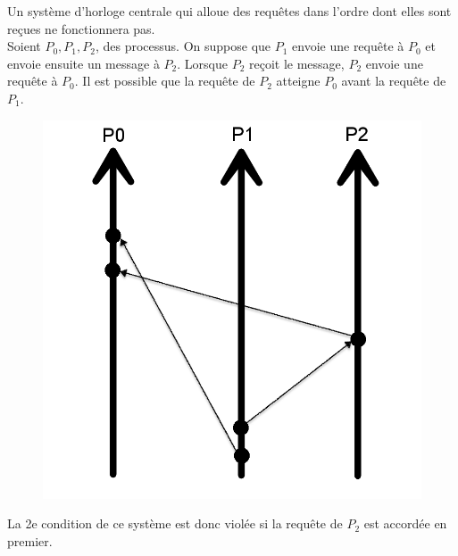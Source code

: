 \documentclass[compress]{beamer}
\begin{document}
\begin{frame}
Un système d'horloge centrale qui alloue des requêtes dans l'ordre dont elles sont reçues ne fonctionnera pas.\\
Soient $P_0, P_1, P_2$, des processus. On suppose que $P_1$ envoie une requête à $P_0$ et envoie ensuite
un message à $P_2$. Lorsque $P_2$ reçoit le message, $P_2$ envoie une requête à $P_0$. Il est possible que la requête de $P_2$ atteigne $P_0$ avant la requête de $P_1$.
\begin{figure}\includegraphics[scale=0.12]{process4.png}\end{figure}
La 2e condition de ce système est donc violée si la requête de $P_2$ est accordée en premier.
\end{frame}
\end{document}
